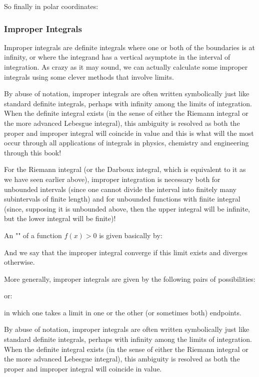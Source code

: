 	So finally in polar coordinates:
	
	
	\subsubsection{Improper Integrals}
	Improper integrals are definite integrals where one or both of the boundaries is at infinity, or where the integrand has a vertical asymptote in the interval of integration. As crazy as it may sound, we can actually calculate some improper integrals using some clever methods that involve limits.
	
	By abuse of notation, improper integrals are often written symbolically just like standard definite integrals, perhaps with infinity among the limits of integration. When the definite integral exists (in the sense of either the Riemann integral or the more advanced Lebesgue integral), this ambiguity is resolved as both the proper and improper integral will coincide in value and this is what will the most occur through all applications of integrals in physics, chemistry and engineering through this book!
	
	For the Riemann integral (or the Darboux integral, which is equivalent to it as we have seen earlier above), improper integration is necessary both for unbounded intervals (since one cannot divide the interval into finitely many subintervals of finite length) and for unbounded functions with finite integral (since, supposing it is unbounded above, then the upper integral will be infinite, but the lower integral will be finite)!
	
	An "\label{improper integral}" of a function $f(x) > 0$ is given basically by:
	
	And we say that the improper integral converge if this limit exists and diverges otherwise.
	
	More generally, improper integrals are given by the following pairs of possibilities:
	
	or:
	
	in which one takes a limit in one or the other (or sometimes both) endpoints.
	\begin{tcolorbox}[title=Remark,colframe=black,arc=10pt]
	By abuse of notation, improper integrals are often written symbolically just like standard definite integrals, perhaps with infinity among the limits of integration. When the definite integral exists (in the sense of either the Riemann integral or the more advanced Lebesgue integral), this ambiguity is resolved as both the proper and improper integral will coincide in value.
	\end{tcolorbox}
	
